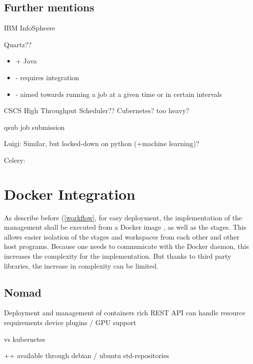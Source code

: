 \subsection{Further mentions}


IBM InfoSpheere \cite{infosphere:datastage}



Quartz?? 
\cite{quartz:main}
\cite{quartz:overview}
\cite{quartz:quickstart}
\begin{itemize}
	\item + Java
	\item - requires integration
	\item - aimed towards running a job at a given time or in certain intervals
\end{itemize}

CSCS High Throughput Scheduler?? \cite{cscs:high_throughput}
Cubernetes? too heavy?

qsub job submission %


Luigi: Similar, but locked-down on python  (+machine learning)? \cite{luigi:etc:distributed_pipelines}

Celery: \cite{celery:main}

\section{Docker Integration}

As describe before (\ref{workflow}, for easy deployment, the implementation of the management shall be executed from a Docker image \cite{docker:main}, as well as the stages.
This allows easier isolation of the stages and workspaces from each other and other host programs.
Because one needs to communicate with the Docker daemon, this increases the complexity for the implementation.
But thanks to third party libraries, the increase in complexity can be limited.



\subsection{Nomad}

\cite{nomad:etc:gui_thesis}

\cite{nomad:main}
Deployment and management of containers
rich REST API
can handle resource requirements
device plugins / GPU support

vs kubernetes \cite{nomad:vs:kubernetes}

++ available through debian / ubuntu std-repositories



